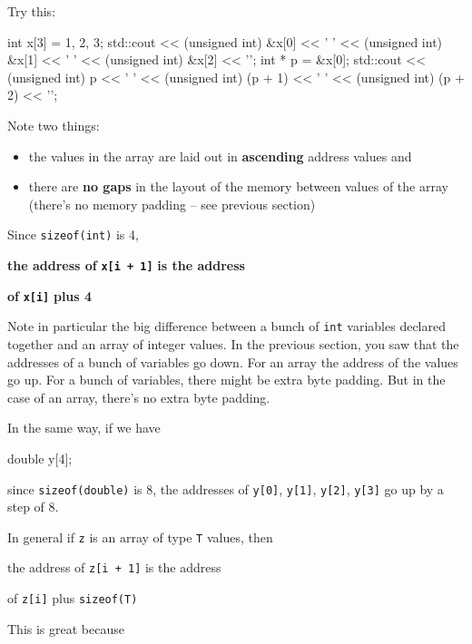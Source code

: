 \newpage{}

Try this:

\begin{consolethree}[escapeinside=||]
int x[3] = {1, 2, 3};
std::cout << (unsigned int) &x[0] << ' '
          << (unsigned int) &x[1] << ' '
          << (unsigned int) &x[2] << '\n';
int * p = &x[0];
std::cout << (unsigned int) p << ' '
          << (unsigned int) (p + 1) << ' '
          << (unsigned int) (p + 2) << '\n';
\end{consolethree}

Note two things:

\begin{itemize}
\item the values in the array are laid out in \textbf{ascending} address
  values and
\item there are \textbf{no gaps} in the layout of the memory between values
  of the array (there's no memory padding -- see previous section)
\end{itemize}

Since \texttt{sizeof(int)} is 4,

\textbf{ the address of }\texttt{\textbf{x[i + 1]}}\textbf{ is the address }

\textbf{ of }\texttt{\textbf{x[i]}}\textbf{ plus 4}

Note in particular the big difference between a bunch of \texttt{int}
variables declared together and an array of integer values. In the
previous section, you saw that the addresses of a bunch of variables go
down. For an array the address of the values go up. For a bunch of
variables, there might be extra byte padding. But in the case of an
array, there's no extra byte padding.

In the same way, if we have

\begin{consolethree}[escapeinside=||]
double y[4];
\end{consolethree}

since \texttt{sizeof(double)} is 8, the addresses of \texttt{y[0]},
\texttt{y[1]}, \texttt{y[2]}, \texttt{y[3]} go up by a step of 8.

In general if \texttt{z} is an array of type \texttt{T} values, then

the address of \texttt{z[i + 1]} is the address

of \texttt{z[i]} plus \texttt{sizeof(T)}

This is great because

